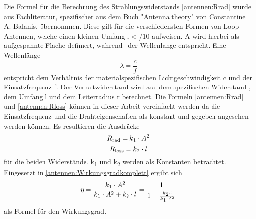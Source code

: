 Die Formel für die Berechnung des Strahlungswiderstands \eqref{antennen:Rrad} wurde aus Fachliteratur, spezifischer aus dem Buch "Antenna theory" von Constantine A. Balanis, übernommen. Diese gilt für die verschiedensten Formen von Loop-Antennen, welche einen kleinen Umfang  l < \textlambda/10 aufweisen. A wird hierbei als aufgespannte Fläche definiert, während \textlambda\ der Wellenlänge entspricht. Eine Wellenlänge 
\begin{equation}
	\lambda=\frac{c}{f}
	\label{antennen:Lambda}
\end{equation}
entspricht dem Verhältnis der materialspezifischen Lichtgeschwindigkeit c und der Einsatzfrequenz f.
Der Verlustwiderstand wird aus dem spezifischen Widerstand \textrho, dem Umfang l und dem Leiterradius r berechnet. Die Formeln \eqref{antennen:Rrad} und \eqref{antennen:Rloss} können in dieser Arbeit vereinfacht werden da die Einsatzfrequenz und die Drahteigenschaften als konstant und gegeben angesehen werden können. Es resultieren die Ausdrücke 
\begin{equation}
	R\textsubscript{rad}=k\textsubscript{1}\cdot{A^2}
	\label{antennen:Rrad_konst}
\end{equation}
\begin{equation}
	R\textsubscript{loss}=k\textsubscript{2}\cdot{l}
	\label{antennen:Rloss_konst}
\end{equation}
für die beiden Widerstände. k\textsubscript{1} und k\textsubscript{2} werden als Konstanten betrachtet. Eingesetzt in \eqref{antennen:Wirkungsgradkomplett} ergibt sich
\begin{equation}
	\eta=\frac{k\textsubscript{1}\cdot{A^2}}{k\textsubscript{1}\cdot{A^2}+{k\textsubscript{2}\cdot{l}}}=\frac{1}{1+\frac{k\textsubscript{2}\cdot{l}}{k\textsubscript{1}\cdot{A^2}}}
	\label{antennen:Wirkungsgradeingesetzt}
\end{equation}
als Formel für den Wirkungsgrad.

